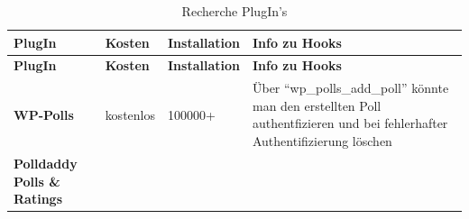 \begin{longtable}[c]{@{}llll@{}}
\caption{Recherche PlugIn's}\tabularnewline
\toprule
\begin{minipage}[b]{0.24\columnwidth}\raggedright\strut
\textbf{PlugIn}
\strut\end{minipage} &
\begin{minipage}[b]{0.12\columnwidth}\raggedright\strut
\textbf{Kosten}
\strut\end{minipage} &
\begin{minipage}[b]{0.20\columnwidth}\raggedright\strut
\textbf{Installation}
\strut\end{minipage} &
\begin{minipage}[b]{0.33\columnwidth}\raggedright\strut
\textbf{Info zu Hooks}
\strut\end{minipage}\tabularnewline
\midrule
\endfirsthead
\toprule
\begin{minipage}[b]{0.24\columnwidth}\raggedright\strut
\textbf{PlugIn}
\strut\end{minipage} &
\begin{minipage}[b]{0.12\columnwidth}\raggedright\strut
\textbf{Kosten}
\strut\end{minipage} &
\begin{minipage}[b]{0.20\columnwidth}\raggedright\strut
\textbf{Installation}
\strut\end{minipage} &
\begin{minipage}[b]{0.33\columnwidth}\raggedright\strut
\textbf{Info zu Hooks}
\strut\end{minipage}\tabularnewline
\midrule
\endhead
\begin{minipage}[t]{0.24\columnwidth}\raggedright\strut
\textbf{WP-Polls}
\strut\end{minipage} &
\begin{minipage}[t]{0.12\columnwidth}\raggedright\strut
kostenlos
\strut\end{minipage} &
\begin{minipage}[t]{0.20\columnwidth}\raggedright\strut
100000+
\strut\end{minipage} &
\begin{minipage}[t]{0.33\columnwidth}\raggedright\strut
Über ``wp\_polls\_add\_poll'' könnte man den erstellten Poll
authentfizieren und bei fehlerhafter Authentifizierung löschen
\strut\end{minipage}\tabularnewline
\begin{minipage}[t]{0.24\columnwidth}\raggedright\strut
\textbf{Polldaddy Polls \& Ratings}
\strut\end{minipage} &

\end{longtable}
